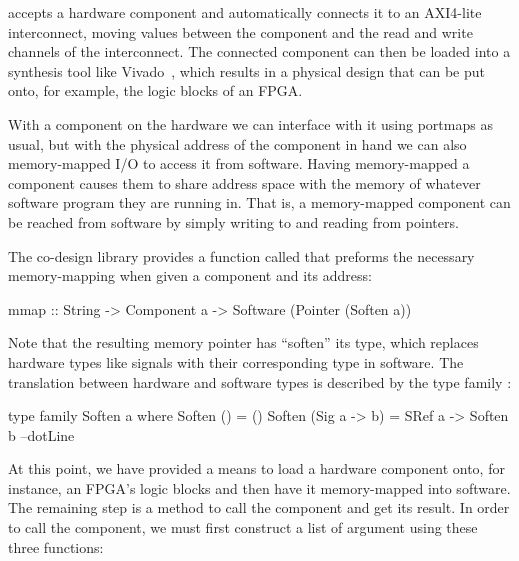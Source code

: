 \documentclass[../paper.tex]{subfiles}
\begin{document}
 accepts a hardware component and automatically connects it to an AXI4-lite interconnect, moving values between the component and the read and write channels of the interconnect. The connected component can then be loaded into a synthesis tool like Vivado~\cite{feist2012}, which results in a physical design that can be put onto, for example, the logic blocks of an FPGA.


With a component on the hardware we can interface with it using portmaps as usual, but with the physical address of the component in hand we can also memory-mapped I/O to access it from software. Having memory-mapped a component causes them to share address space with the memory of whatever software program they are running in. That is, a memory-mapped component can be reached from software by simply writing to and reading from pointers.


The co-design library provides a function called  that preforms the necessary memory-mapping when given a component and its address:

\begin{code}
mmap :: String -> Component a -> Software (Pointer (Soften a))
\end{code}

\noindent Note that the resulting memory pointer has ``soften'' its type, which replaces hardware types like signals with their corresponding type in software. The translation between hardware and software types is described by the type family :

\begin{code}
type family Soften a where
  Soften ()           = ()
  Soften (Sig a -> b) = SRef a -> Soften b
  --dotLine
\end{code}

At this point, we have provided a means to load a hardware component onto, for instance, an FPGA's logic blocks and then have it memory-mapped into software. The remaining step is a method to call the component and get its result. In order to call the component, we must first construct a list of argument using these three functions:
\end{document}
